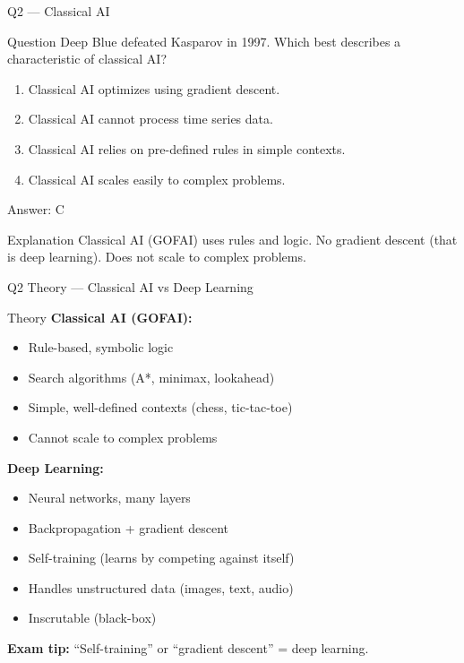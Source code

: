 \documentclass[aspectratio=169,8pt]{beamer}
\begin{document}
	\begin{frame}{Q2 --- Classical AI}
		\begin{block}{Question}
			Deep Blue defeated Kasparov in 1997. Which best describes a characteristic of classical AI?
		\end{block}
		\begin{enumerate}[label=\Alph*.]
			\item Classical AI optimizes using gradient descent.
			\item Classical AI cannot process time series data.
			\item Classical AI relies on pre-defined rules in simple contexts.
			\item Classical AI scales easily to complex problems.
		\end{enumerate}
		\begin{exampleblock}{Answer: C}
		\end{exampleblock}
		\begin{block}{Explanation}
			Classical AI (GOFAI) uses rules and logic. No gradient descent (that is deep learning). Does not scale to complex problems.
		\end{block}
	\end{frame}
	
	\begin{frame}{Q2 Theory --- Classical AI vs Deep Learning}
		\begin{block}{Theory}
			\textbf{Classical AI (GOFAI):}
			\begin{itemize}
				\item Rule-based, symbolic logic
				\item Search algorithms (A*, minimax, lookahead)
				\item Simple, well-defined contexts (chess, tic-tac-toe)
				\item Cannot scale to complex problems
			\end{itemize}
			\textbf{Deep Learning:}
			\begin{itemize}
				\item Neural networks, many layers
				\item Backpropagation + gradient descent
				\item Self-training (learns by competing against itself)
				\item Handles unstructured data (images, text, audio)
				\item Inscrutable (black-box)
			\end{itemize}
			\textbf{Exam tip:} ``Self-training'' or ``gradient descent'' = deep learning.
		\end{block}
	\end{frame}
	
\end{document}
